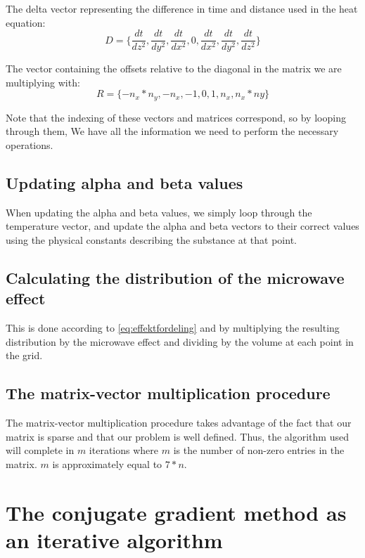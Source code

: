 The delta vector representing the difference in time and distance used in the heat
equation:
\begin{equation}
D = \{ \frac{dt}{dz^2}, \frac{dt}{dy^2}, \frac{dt}{dx^2}, 0, \frac{dt}{dx^2}, \frac{dt}{dy^2}, \frac{dt}{dz^2} \}
\end{equation}

The vector containing the offsets relative to the diagonal in the matrix we are multiplying
with:
\begin{equation}
R = \{ -n_x*n_y, -n_x, -1, 0, 1, n_x, n_x*ny \}
\end{equation}

Note that the indexing of these vectors and matrices correspond, so by looping through them,
We have all the information we need to perform the necessary operations.

\subsection{Updating alpha and beta values}

When updating the alpha and beta values, we simply loop through the temperature
vector, and update the alpha and beta vectors to their correct values using the
physical constants describing the substance at that point.

\subsection{Calculating the distribution of the microwave effect}

This is done according to \cref{eq:effektfordeling} and by multiplying the
resulting distribution by the microwave effect and dividing by the volume at each point
in the grid.

\subsection{The matrix-vector multiplication procedure}

The matrix-vector multiplication procedure takes advantage of the fact that our 
matrix is sparse and that our problem is well defined. Thus, the algorithm used
will complete in $m$ iterations where $m$ is the number of non-zero entries in 
the matrix. $m$ is approximately equal to $7*n$.

\section{The conjugate gradient method as an iterative algorithm}

